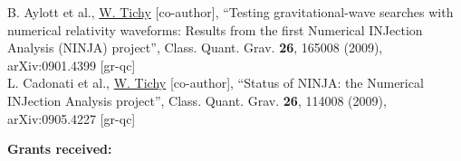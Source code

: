 \documentclass[11pt]{article}
\begin{document}
B. Aylott et al., \underline{W. Tichy} [co-author],
``Testing gravitational-wave searches with numerical relativity waveforms:
Results from the first Numerical INJection Analysis (NINJA) project'',
Class. Quant. Grav. {\bf 26}, 165008 (2009), arXiv:0901.4399 [gr-qc]
\\

L. Cadonati et al., \underline{W. Tichy} [co-author],
``Status of NINJA: the Numerical INJection Analysis project'',
Class. Quant. Grav. {\bf 26}, 114008 (2009), arXiv:0905.4227 [gr-qc]
\\

\bigskip

\bigskip  
\bigskip  
\bigskip  
\bigskip  


{\bf Grants received:}
\end{document}
